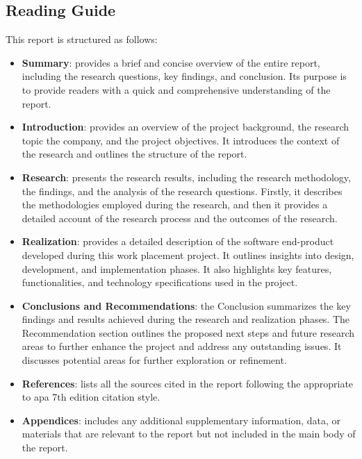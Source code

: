 \begin{multicols}{2}
      \section{Reading Guide}
      This report is structured as follows:
      \begin{itemize}
            \item \textbf{Summary}: provides a brief and concise overview of the entire report, including the
                  research questions, key findings, and conclusion. Its purpose is to provide readers with a
                  quick and comprehensive understanding of the report.
            \item \textbf{Introduction}: provides an overview of the project background, the research topic the
                  company, and the project objectives. It introduces the context of the research and outlines the
                  structure of the report.
            \item \textbf{Research}: presents the research results, including the research methodology, the findings,
                  and the analysis of the research questions. Firstly, it describes the methodologies employed
                  during the research, and then it provides a detailed account of the research process and the
                  outcomes of the research.
            \item \textbf{Realization}: provides a detailed description of the software end-product developed during
                  this work placement project. It outlines insights into design, development, and implementation
                  phases. It also highlights key features, functionalities, and technology specifications used in
                  the project.
            \item \textbf{Conclusions and Recommendations}: the Conclusion summarizes the key findings and results
                  achieved during the research and realization phases. The Recommendation section outlines the
                  proposed next steps and future research areas to further enhance the project and address any
                  outstanding issues. It discusses potential areas for further exploration or refinement.
            \item \textbf{References}: lists all the sources cited in the report following the appropriate to
                  \acrshort{apa} 7th edition citation style.
            \item \textbf{Appendices}: includes any additional supplementary information, data, or materials that
                  are relevant to the report but not included in the main body of the report.
      \end{itemize}
\end{multicols}